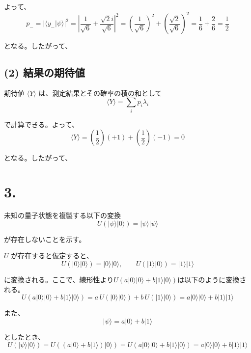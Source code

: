 \documentclass[11pt,a4paper]{ltjsarticle}
\begin{document}
よって、
\[
p_- = \left|\langle y_- \vert \psi\rangle\right|^2
= \left|\frac{1}{\sqrt{6}} + \frac{\sqrt{2}i}{\sqrt{6}}\right|^2
= \left(\frac{1}{\sqrt{6}}\right)^2 + \left(\frac{\sqrt{2}}{\sqrt{6}}\right)^2
= \frac{1}{6} + \frac{2}{6}
= \frac{1}{2}
\]

となる。したがって、

\begin{center}
\end{center}

\subsection*{(2) 結果の期待値}
期待値 $\langle Y \rangle$ は、測定結果とその確率の積の和として
\[
\langle Y \rangle = \sum_i p_i \lambda_i
\]

で計算できる。よって、
\[
\langle Y \rangle
= \left(\frac{1}{2}\right)(+1) + \left(\frac{1}{2}\right)(-1)
= 0
\]

となる。したがって、

\begin{center}
\end{center}

\section*{3.}
未知の量子状態を複製する以下の変換
\[
U(\lvert \psi \rangle \lvert 0 \rangle) = \lvert \psi \rangle \lvert \psi \rangle
\]

が存在しないことを示す。

$U$ が存在すると仮定すると、
\[
U(\lvert 0\rangle \lvert 0\rangle) = \lvert 0\rangle \lvert 0\rangle,\qquad
U(\lvert 1\rangle \lvert 0\rangle) = \lvert 1\rangle \lvert 1\rangle
\]

に変換される。ここで、線形性より$U(a\lvert 0\rangle\lvert 0\rangle + b\lvert 1\rangle\lvert 0\rangle)$は以下のように変換される。
\[
U(a\lvert 0\rangle\lvert 0\rangle + b\lvert 1\rangle\lvert 0\rangle)
= a\,U(\lvert 0\rangle\lvert 0\rangle) + b\,U(\lvert 1\rangle\lvert 0\rangle)
= a\lvert 0\rangle\lvert 0\rangle + b\lvert 1\rangle\lvert 1\rangle
\]

また、
\[
\lvert \psi \rangle = a\lvert 0\rangle + b\lvert 1\rangle
\]

としたとき、
\[
U(\lvert \psi\rangle\lvert 0\rangle)
= U((a\lvert 0\rangle + b\lvert 1\rangle)\lvert 0\rangle)
= U(a\lvert 0\rangle\lvert 0\rangle + b\lvert 1\rangle\lvert 0\rangle)
= a\lvert 0\rangle\lvert 0\rangle + b\lvert 1\rangle\lvert 1\rangle
\]
\end{document}
